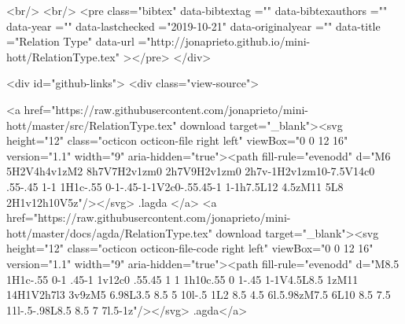   <br/>
  <br/>
  <pre class="bibtex"
       data-bibtextag =""
       data-bibtexauthors =""
       data-year =""
       data-lastchecked ="2019-10-21"
       data-originalyear =""
       data-title ="Relation Type"
       data-url ="http://jonaprieto.github.io/mini-hott/RelationType.tex"
  ></pre>
  </div>
  

  <div id="github-links">
    <div class="view-source">
      
        <a href="https://raw.githubusercontent.com/jonaprieto/mini-hott/master/src/RelationType.tex" download target="_blank"><svg height="12" class="octicon octicon-file right left" viewBox="0 0 12 16" version="1.1" width="9" aria-hidden="true"><path fill-rule="evenodd" d="M6 5H2V4h4v1zM2 8h7V7H2v1zm0 2h7V9H2v1zm0 2h7v-1H2v1zm10-7.5V14c0 .55-.45 1-1 1H1c-.55 0-1-.45-1-1V2c0-.55.45-1 1-1h7.5L12 4.5zM11 5L8 2H1v12h10V5z"/></svg> .lagda </a>
        <a href="https://raw.githubusercontent.com/jonaprieto/mini-hott/master/docs/agda/RelationType.tex" download target="_blank"><svg height="12" class="octicon octicon-file-code right left" viewBox="0 0 12 16" version="1.1" width="9" aria-hidden="true"><path fill-rule="evenodd" d="M8.5 1H1c-.55 0-1 .45-1 1v12c0 .55.45 1 1 1h10c.55 0 1-.45 1-1V4.5L8.5 1zM11 14H1V2h7l3 3v9zM5 6.98L3.5 8.5 5 10l-.5 1L2 8.5 4.5 6l.5.98zM7.5 6L10 8.5 7.5 11l-.5-.98L8.5 8.5 7 7l.5-1z"/></svg> .agda</a>
      
